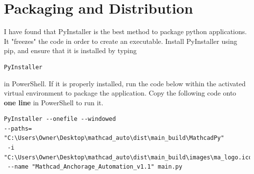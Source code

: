 \documentclass[11pt]{article}
\begin{document}
\section{Packaging and Distribution}
\label{sec:orgcccaf9d}
I have found that PyInstaller is the best method to package python applications. It "freezes" the code in order to create an executable. Install PyInstaller using pip, and ensure that it is installed by typing \begin{verbatim}PyInstaller\end{verbatim} in PowerShell. If it is properly installed, run the code below within the activated virtual environment to package the application. Copy the following code onto \textbf{one line} in PowerShell to run it. 
\begin{verbatim}
PyInstaller --onefile --windowed 
--paths= "C:\Users\Owner\Desktop\mathcad_auto\dist\main_build\MathcadPy" 
 -i  "C:\Users\Owner\Desktop\mathcad_auto\dist\main_build\images\ma_logo.ico" 
 --name "Mathcad_Anchorage_Automation_v1.1" main.py 
\end{verbatim}
\end{document}
